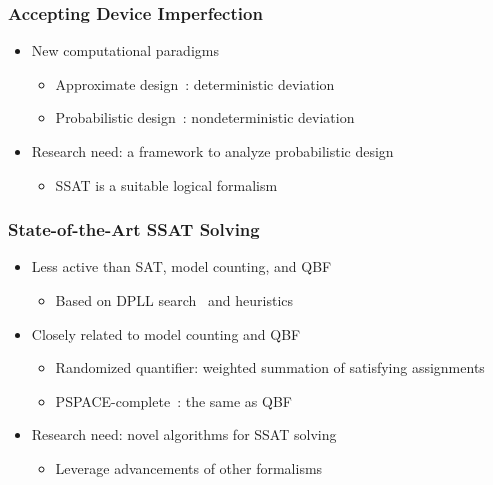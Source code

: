 \begin{frame}
      \frametitle{Accepting Device Imperfection}
      \begin{itemize}
            \item New computational paradigms
                  \begin{itemize}
                        \item Approximate design~\cite{Venkatesan2011ApproxDesign}: deterministic deviation
                        \item Probabilistic design~\cite{Chakrapani2006ProbDesign}: nondeterministic deviation
                  \end{itemize}
                  \pause
            \item \alert{Research need: a framework to analyze probabilistic design}
                  \begin{itemize}
                        \item SSAT is a suitable logical formalism
                  \end{itemize}
      \end{itemize}
\end{frame}

\begin{frame}
      \frametitle{State-of-the-Art SSAT Solving}
      \begin{itemize}
            \item Less active than SAT, model counting, and QBF
                  \begin{itemize}
                        \item Based on DPLL search~\cite{Davis1962} and heuristics
                  \end{itemize}
                  \pause
            \item Closely related to model counting and QBF
                  \begin{itemize}
                        \item Randomized quantifier: weighted summation of satisfying assignments
                        \item PSPACE-complete~\cite{Stockmeyer1973}: the same as QBF
                  \end{itemize}
                  \pause
            \item \alert{Research need: novel algorithms for SSAT solving}
                  \begin{itemize}
                        \item Leverage advancements of other formalisms
                  \end{itemize}
      \end{itemize}
\end{frame}

